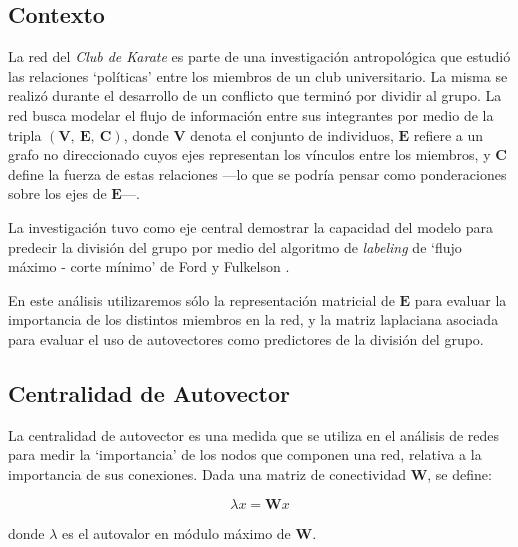 
\vspace{1em}
\subsection{Contexto}

La red del \textit{Club de Karate} es parte de una investigación antropológica  que estudió las relaciones `políticas' entre los miembros de un club universitario. La misma se realizó durante el desarrollo de un conflicto que terminó por dividir al grupo. La red busca modelar el flujo de información entre sus integrantes por medio de la tripla $(\mathbf{V},\ \mathbf{E},\ \mathbf{C})$, donde $\mathbf{V}$ denota el conjunto de individuos, $\mathbf{E}$ refiere a un grafo no direccionado cuyos ejes representan los vínculos entre los miembros, y $\mathbf{C}$ define la fuerza de estas relaciones ---lo que se podría pensar como ponderaciones sobre los ejes de $\mathbf{E}$---. 

La investigación tuvo como eje central demostrar la capacidad del modelo para predecir la división del grupo por medio del algoritmo de \textit{labeling} de `flujo máximo - corte mínimo' de Ford y Fulkelson .

\vspace{1em}
En este análisis utilizaremos sólo la representación matricial de $\mathbf{E}$ para evaluar la importancia de los distintos miembros en la red, y la matriz laplaciana asociada para evaluar el uso de autovectores como predictores de la división del grupo. 





\vspace{2em}
\subsection{Centralidad de Autovector} La centralidad de autovector es una medida que se utiliza en el análisis de redes para medir la `importancia' de los nodos que componen una red, relativa a la importancia de sus conexiones. Dada una matriz de conectividad \textbf{W}, se define:

\vspace{1em}
\begin{equation} \label{conectividad}
    \lambda x = \mathbf{W} x
\end{equation}

\vspace{1em}
\noindent donde $\lambda$ es el autovalor en módulo máximo de \textbf{W}.

